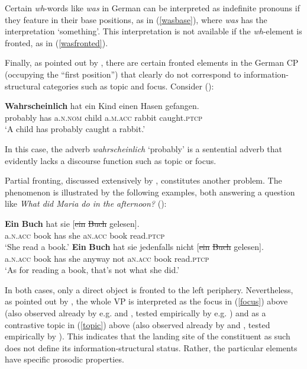 Certain \textit{wh}-words like \textit{was} in German can be interpreted as indefinite pronouns if they feature in their base positions, as in (\ref{wasbase}), where \textit{was} has the interpretation `something'. This interpretation is not available if the \textit{wh}-element is fronted, as in (\ref{wasfronted}).

Finally, as pointed out by \citet[173]{fanselowlenertova2011}, there are certain fronted elements in the German CP (occupying the ``first position'') that clearly do not correspond to information-structural categories such as topic and focus. Consider (\citealt[173, ex. 7a]{fanselowlenertova2011}):

\ea \gll \textbf{Wahrscheinlich} hat ein Kind einen Hasen gefangen.\\
probably has a.\textsc{n.nom} child a.\textsc{m.acc} rabbit caught.\textsc{ptcp}\\
\glt `A child has probably caught a rabbit.'
\z

In this case, the adverb \textit{wahrscheinlich} `probably' is a sentential adverb that evidently lacks a discourse function such as topic or focus.

Partial fronting, discussed extensively by \citet{wierzba2017diss}, constitutes another problem. The phenomenon is illustrated by the following examples, both answering a question like \textit{What did Maria do in the afternoon?} (\citealt[1, ex. 1]{wierzba2017diss}):

\ea
\ea \gll \textbf{Ein} \textbf{Buch} hat sie [\sout{ein} \sout{Buch} gelesen]. \label{focus}\\
a.\textsc{n.acc} book has she \phantom{[}a\textsc{n.acc} book read.\textsc{ptcp}\\
\glt `She read a book.'
\ex \gll \textbf{Ein} \textbf{Buch} hat sie jedenfalls nicht [\sout{ein} \sout{Buch} gelesen]. \label{topic}\\
a.\textsc{n.acc} book has she anyway not \phantom{[}a\textsc{n.acc} book read.\textsc{ptcp}\\
\glt `As for reading a book, that's not what she did.'
\z
\z

In both cases, only a direct object is fronted to the left periphery. Nevertheless, as pointed out by \citet[1]{wierzba2017diss}, the whole VP is interpreted as the focus in (\ref{focus}) above (also observed already by e.g. \citealt{hoehle1982} and \citealt{krifka1998}, tested empirically by e.g. \citealt{ferydrenhaus2008}) and as a contrastive topic in (\ref{topic}) above (also observed already by \citealt{buering1997} and \citealt{jacobs1997}, tested empirically by \citealt{wierzba2011}). This indicates that the landing site of the constituent as such does not define its information-structural status. Rather, the particular elements have specific prosodic properties.

